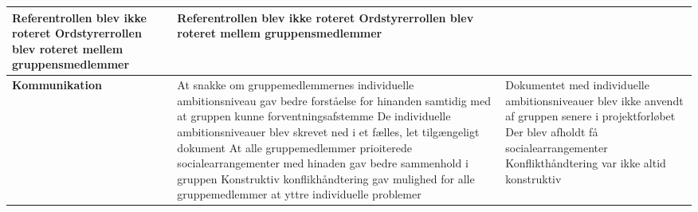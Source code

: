 \begin{table}[h]
\begin{tabular}{|p{3.5cm}|p{5cm}|p{5cm}|}
		       Referentrollen blev ikke roteret                                                                                                                       \newline
			   Ordstyrerrollen blev roteret mellem gruppensmedlemmer                                                                                                  \newline
		                                                           &   Referentrollen blev ikke roteret                                                               \newline
		                                                           	   Ordstyrerrollen blev roteret mellem gruppensmedlemmer                                       \\ \hline
		\textbf{Kommunikation}                        &   
		       At snakke om gruppemedlemmernes individuelle ambitionsniveau gav bedre forståelse for hinanden samtidig med at gruppen kunne forventningsafstemme      \newline
		 	   De individuelle ambitionsniveauer blev skrevet ned i et fælles, let tilgængeligt dokument                                                              \newline
		 	   At alle gruppemedlemmer prioiterede socialearrangementer med hinaden gav bedre sammenhold i gruppen                                                    \newline
		 	   Konstruktiv konflikhåndtering gav mulighed for alle gruppemedlemmer at yttre individuelle problemer                                                    \newline
		 	                                                       &   Dokumentet med individuelle ambitionsniveauer blev ikke anvendt af gruppen senere i projektforløbet \newline
		                                                       	       Der blev afholdt få socialearrangementer                                                       \newline
		                                                       	       Konflikthåndtering var ikke altid konstruktiv                                               \\ \hline
	\end{tabular}
\end{table}